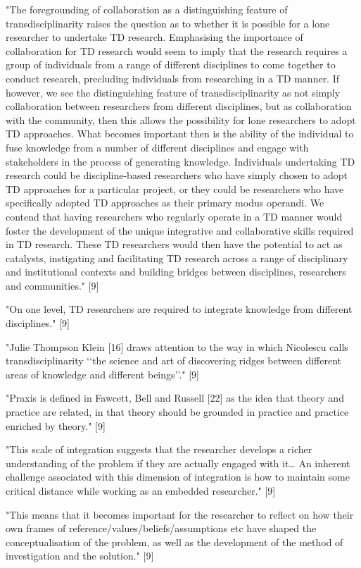 "The foregrounding of collaboration as a distinguishing feature of transdisciplinarity raises the question as to whether it is possible for a lone researcher to undertake TD research. Emphasising the importance of collaboration for TD research would seem to imply that the research requires a group of individuals from a range of different disciplines to come together to conduct research, precluding individuals from researching in a TD manner. If however, we see the distinguishing feature of transdisciplinarity as not simply collaboration between researchers from different disciplines, but as collaboration with the community, then this allows the possibility for lone researchers to adopt TD approaches. What becomes important then is the ability of the individual to fuse knowledge from a number of different disciplines and engage with stakeholders in the process of generating knowledge. Individuals undertaking TD research could be discipline-based researchers who have simply chosen to adopt TD approaches for a particular project, or they could be researchers who have specifically adopted TD approaches as their primary modus operandi. We contend that having researchers who regularly operate in a TD manner would foster the development of the unique integrative and collaborative skills required in TD research. These TD researchers would then have the potential to act as catalysts, instigating and facilitating TD research across a range of disciplinary and institutional contexts and building bridges between disciplines, researchers and communities." [9]

"On one level, TD researchers are required to integrate knowledge from different disciplines." [9]

"Julie Thompson Klein [16] draws attention to the way in which Nicolescu calls transdisciplinarity ‘‘the science and art of discovering ridges between different areas of knowledge and different beings’’." [9]

"Praxis is defined in Fawcett, Bell and Russell [22] as the idea that theory and practice are related, in that theory should be grounded in practice and practice enriched by theory." [9]

"This scale of integration suggests that the researcher develops a richer understanding of the problem if they are actually engaged with it… An inherent challenge associated with this dimension of integration is how to maintain some critical distance while working as an embedded researcher." [9]

"This means that it becomes important for the researcher to reflect on how their own frames of reference/values/beliefs/assumptions etc have shaped the conceptualisation of the problem, as well as the development of the method of investigation and the solution." [9]

